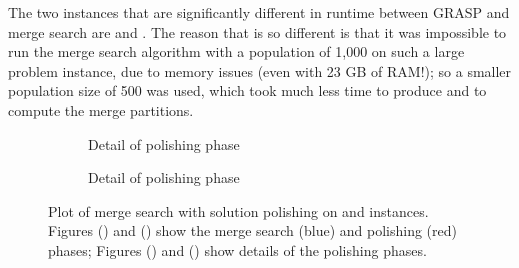 \documentclass[journal]{IEEEtran}
\begin{document}
The two instances that are significantly different in runtime between GRASP and merge search are \dmine{} and \zucklarge{}. The reason that \zucklarge{} is so different is that it was impossible to run the merge search algorithm with a population of 1,000 on such a large problem instance, due to memory issues (even with 23 GB of RAM!); so a smaller population size of 500 was used, which took much less time to produce and to compute the merge partitions.

\begin{figure}[h]
    \centering
    \begin{subfigure}[t]{0.23\textwidth}
    \centering
    \vspace*{-5mm}\caption{\zuckmed{}}
    \label{plot:polish.med1}
    \end{subfigure}
    \quad
    \begin{subfigure}[t]{0.23\textwidth}
    \centering
    \caption{Detail of polishing phase}
    \label{plot:polish.med2}
    \end{subfigure}
    \quad
    \centering
    \begin{subfigure}[t]{0.23\textwidth}
    \centering
    \vspace*{-5mm}\caption{\zucklarge{}}
    \label{plot:polish.large1}
    \end{subfigure}
    \quad
    \begin{subfigure}[t]{0.23\textwidth}
    \centering
    \vspace*{-5mm}\caption{Detail of polishing phase}
    \label{plot:polish.large2}
    \end{subfigure}
    \caption[Plot of merge search with solution polishing on \zuckmed{} and \zucklarge{} instances]{Plot of merge search with solution polishing on \zuckmed{} and \zucklarge{} instances. Figures () and () show the merge search (blue) and polishing (red) phases; Figures () and () show details of the polishing phases.}
    \label{plot:mine:polish}
\end{figure}
\end{document}
